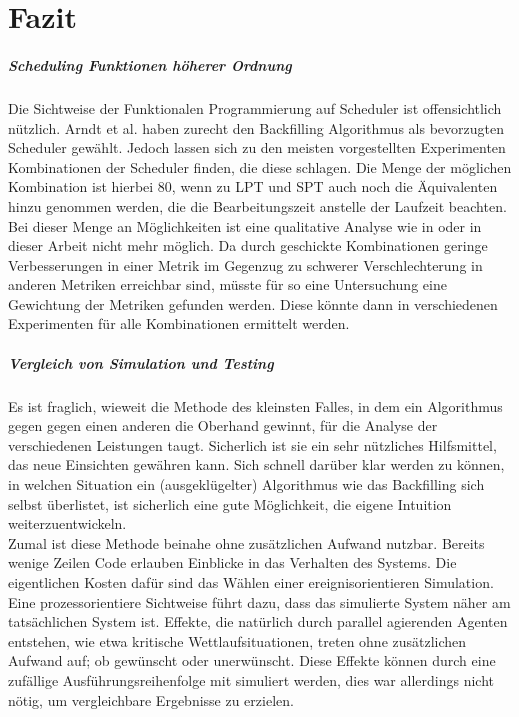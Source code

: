 \chapter{Fazit}

\paragraph{Scheduling Funktionen höherer Ordnung}
Die Sichtweise der Funktionalen Programmierung auf Scheduler ist offensichtlich nützlich. Arndt et al. \cite{Arn99} haben zurecht den Backfilling Algorithmus als bevorzugten Scheduler gewählt. Jedoch lassen sich zu den meisten vorgestellten Experimenten Kombinationen der Scheduler finden, die diese schlagen. Die Menge der möglichen Kombination ist hierbei 80, wenn zu LPT und SPT auch noch die Äquivalenten hinzu genommen werden, die die Bearbeitungszeit anstelle der Laufzeit beachten. Bei dieser Menge an Möglichkeiten ist eine qualitative Analyse wie in \cite{Arn99} oder in dieser Arbeit nicht mehr möglich. Da durch geschickte Kombinationen geringe Verbesserungen in einer Metrik im Gegenzug zu schwerer Verschlechterung in anderen Metriken erreichbar sind, müsste für so eine Untersuchung eine Gewichtung der Metriken gefunden werden. Diese könnte dann in verschiedenen Experimenten für alle Kombinationen ermittelt werden.


\paragraph{Vergleich von Simulation und Testing}
Es ist fraglich, wieweit die Methode des kleinsten Falles, in dem ein Algorithmus gegen gegen einen anderen die Oberhand gewinnt, für die Analyse der verschiedenen Leistungen taugt. Sicherlich ist sie ein sehr nützliches Hilfsmittel, das neue Einsichten gewähren kann. Sich schnell darüber klar werden zu können, in welchen Situation ein (ausgeklügelter) Algorithmus wie das Backfilling sich selbst überlistet, ist sicherlich eine gute Möglichkeit, die eigene Intuition weiterzuentwickeln.\\
Zumal ist diese Methode beinahe ohne zusätzlichen Aufwand nutzbar. Bereits wenige Zeilen Code erlauben Einblicke in das Verhalten des Systems. Die eigentlichen Kosten dafür sind das Wählen einer ereignisorientieren Simulation. Eine prozessorientiere Sichtweise führt dazu, dass das simulierte System näher am tatsächlichen System ist. Effekte, die natürlich durch parallel agierenden Agenten entstehen, wie etwa kritische Wettlaufsituationen, treten ohne zusätzlichen Aufwand auf; ob gewünscht oder unerwünscht. Diese Effekte können durch eine zufällige Ausführungsreihenfolge mit simuliert werden, dies war allerdings nicht nötig, um vergleichbare Ergebnisse zu erzielen.

